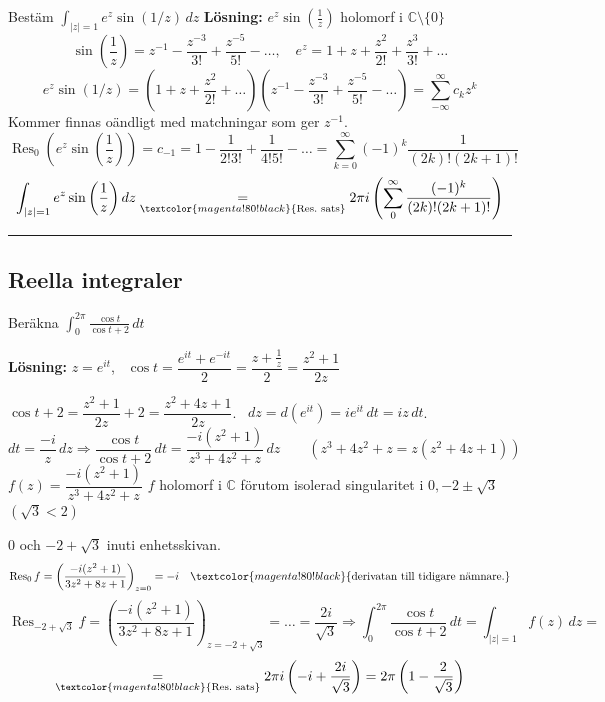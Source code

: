 \begin{example}
Bestäm $\displaystyle\int_{|z| = 1} e^z \sin(1/z)\,dz$
\textbf{Lösning:} $e^z \sin(\frac{1}{z})$ holomorf i $\mathbb{C} \setminus \{0\}$
\[ \sin\left( \frac{1}{z} \right) = z^{-1} - \frac{z^{-3}}{3!} + \frac{z^{-5}}{5!} - \dots, \quad e^z = 1 + z + \frac{z^2}{2!} + \frac{z^3}{3!} + \dots \]
\[ e^z \sin(1/z) = \left( 1 + z + \frac{z^2}{2!} + \dots \right)\left( z^{-1} - \frac{z^{-3}}{3!} + \frac{z^{-5}}{5!} - \dots \right) = \sum_{-\infty}^\infty c_k z^k \]
\textcolor{magenta!80!black}{Kommer finnas oändligt med matchningar som ger $z^{-1}$.}
\[ \operatorname{Res}_0\left( e^z \sin\left( \frac{1}{z} \right) \right) = c_{-1} = 1 - \frac{1}{2!3!} + \frac{1}{4!5!} - \dots = \sum_{k = 0}^\infty (-1)^k \frac{1}{(2k)!(2k + 1)!} \]
\[ \int_{|z| = 1} e^z \sin\left( \frac{1}{z} \right) dz \underset{\textcolor{magenta!80!black}{\text{Res.\ sats}}}{=} 2\pi i\left( \sum_0^\infty \frac{(-1)^k}{(2k)!(2k + 1)!} \right) \]
\end{example}

\noindent\rule{\linewidth}{0.4pt}

\subsection{Reella integraler}
\begin{example}
Beräkna $\displaystyle\int_0^{2\pi} \frac{\cos t}{\cos t + 2}\,dt$

\textbf{Lösning:} $z = e^{it}$, \ $\cos t = \dfrac{e^{it} + e^{-it}}{2} = \dfrac{z + \frac{1}{z}}{2} = \dfrac{z^2 + 1}{2z}$

$\cos t + 2 = \dfrac{z^2 + 1}{2z} + 2 = \dfrac{z^2 + 4z + 1}{2z}$. \ $dz = d(e^{it}) = ie^{it}\,dt = iz\,dt$.
\[ dt = \frac{-i}{z}\,dz \Rightarrow \frac{\cos t}{\cos t + 2}\,dt = \frac{-i(z^2 + 1)}{z^3 + 4z^2 + z}\,dz \qquad (z^3 + 4z^2 + z = z(z^2 + 4z + 1)) \]
$f(z) = \dfrac{-i(z^2 + 1)}{z^3 + 4z^2 + z}$ \quad $f$ holomorf i $\mathbb{C}$ förutom isolerad singularitet i $0, -2 \pm \sqrt{3}$
\textcolor{magenta!80!black}{$(\sqrt{3} < 2)$}

$0$ och $-2 + \sqrt{3}$ inuti enhetsskivan.
\[ \operatorname{Res}_0 f = \left( \frac{-i(z^2 + 1)}{3z^2 + 8z + 1} \right)_{z = 0} = -i \quad \textcolor{magenta!80!black}{\text{derivatan till tidigare nämnare.}} \]
\[ \operatorname{Res}_{-2 + \sqrt{3}} f = \left( \frac{-i(z^2 + 1)}{3z^2 + 8z + 1} \right)_{z = -2 + \sqrt{3}} = \dots = \frac{2i}{\sqrt{3}} \Rightarrow \int_0^{2\pi} \frac{\cos t}{\cos t + 2}\,dt = \int_{|z| = 1} f(z)\,dz = \]
\[ \underset{\textcolor{magenta!80!black}{\text{Res.\ sats}}}{=} 2\pi i\left( -i + \frac{2i}{\sqrt{3}} \right) = 2\pi\left( 1 - \frac{2}{\sqrt{3}} \right) \]
\end{example}
